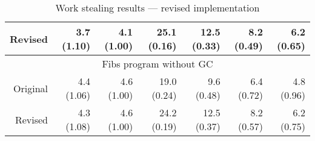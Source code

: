 \begin{table}
\begin{center}
\begin{tabular}{r|rr|rrrr}
Revised
&  3.7 (1.10) &  4.1 (1.00) 
& 25.1 (0.16) & 12.5 (0.33) &  8.2 (0.49) &  6.2 (0.65) \\
\hline
\hline
\multicolumn{7}{c}{Fibs program without GC} \\
\hline
Original
&  4.4 (1.06) &  4.6 (1.00)
& 19.0 (0.24) &  9.6 (0.48) &  6.4 (0.72) &  4.8 (0.96) \\
Revised
&  4.3 (1.08) &  4.6 (1.00)
& 24.2 (0.19) & 12.5 (0.37) &  8.2 (0.57) &  6.2 (0.75) \\
\end{tabular}
\end{center}
\caption{Work stealing results --- revised implementation}
\label{tab:work_stealing_revised}
\end{table}


